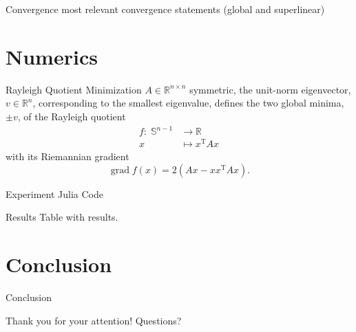\documentclass{beamer}
\begin{document}
\begin{frame}{Convergence}
    most relevant convergence statements (global and superlinear)
\end{frame}


\section{Numerics}

\begin{frame}{Rayleigh Quotient Minimization}
    $A \in \mathbb{R}^{n \times n}$ symmetric, the unit-norm eigenvector, $v \in \mathbb{R}^n$, corresponding to the smallest eigenvalue, defines the two global minima, $\pm v$, of the Rayleigh quotient  
    \begin{equation*}
        \begin{split}
            f \colon \; \mathbb{S}^{n-1} & \to \mathbb{R} \\
            x & \mapsto x^{\mathrm{T}} A x 
        \end{split}
    \end{equation*}   
    with its Riemannian gradient \\[.3\baselineskip]
    \begin{equation*}
        \operatorname{grad} f(x) = 2(Ax - x x^{\mathrm{T}} A x).
    \end{equation*}
\end{frame}

\begin{frame}{Experiment}
    Julia Code
\end{frame}

\begin{frame}{Results}
    Table with results.
\end{frame}

\section{Conclusion}

\begin{frame}{Conclusion}
    
    \begin{center}
        Thank you for your attention! Questions? 
    \end{center}
\end{frame}
\end{document}
